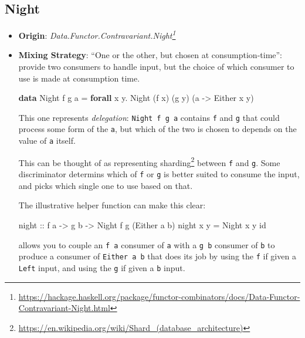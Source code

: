 \documentclass[]{article}
\newenvironment{Shaded}{}{}
\newcommand{\DataTypeTok}[1]{\textcolor[rgb]{0.56,0.13,0.00}{#1}}
\newcommand{\FunctionTok}[1]{\textcolor[rgb]{0.02,0.16,0.49}{#1}}
\newcommand{\KeywordTok}[1]{\textcolor[rgb]{0.00,0.44,0.13}{\textbf{#1}}}
\newcommand{\NormalTok}[1]{#1}
\newcommand{\OperatorTok}[1]{\textcolor[rgb]{0.40,0.40,0.40}{#1}}
\newcommand{\OtherTok}[1]{\textcolor[rgb]{0.00,0.44,0.13}{#1}}
\renewcommand{\href}[2]{#2\footnote{\url{#1}}}
\begin{document}
\subsection{Night}\label{night}

\begin{itemize}
\item
  \textbf{Origin}:
  \emph{\href{https://hackage.haskell.org/package/functor-combinators/docs/Data-Functor-Contravariant-Night.html}{Data.Functor.Contravariant.Night}}
\item
  \textbf{Mixing Strategy}: ``One or the other, but chosen at
  consumption-time'': provide two consumers to handle input, but the choice of
  which consumer to use is made at consumption time.

\begin{Shaded}
\begin{Highlighting}[]
\KeywordTok{data} \DataTypeTok{Night}\NormalTok{ f g a }\OtherTok{=} \KeywordTok{forall}\NormalTok{ x y}\OperatorTok{.} \DataTypeTok{Night}\NormalTok{ (f x) (g y) (a }\OtherTok{{-}\textgreater{}} \DataTypeTok{Either}\NormalTok{ x y)}
\end{Highlighting}
\end{Shaded}

  This one represents \emph{delegation}: \texttt{Night\ f\ g\ a} contains
  \texttt{f} and \texttt{g} that could process some form of the \texttt{a}, but
  which of the two is chosen to depends on the value of \texttt{a} itself.

  This can be thought of as representing
  \href{https://en.wikipedia.org/wiki/Shard_(database_architecture)}{sharding}
  between \texttt{f} and \texttt{g}. Some discriminator determins which of
  \texttt{f} or \texttt{g} is better suited to consume the input, and picks
  which single one to use based on that.

  The illustrative helper function can make this clear:

\begin{Shaded}
\begin{Highlighting}[]
\OtherTok{night ::}\NormalTok{ f a }\OtherTok{{-}\textgreater{}}\NormalTok{ g b }\OtherTok{{-}\textgreater{}} \DataTypeTok{Night}\NormalTok{ f g (}\DataTypeTok{Either}\NormalTok{ a b)}
\NormalTok{night x y }\OtherTok{=} \DataTypeTok{Night}\NormalTok{ x y }\FunctionTok{id}
\end{Highlighting}
\end{Shaded}

  allows you to couple an \texttt{f\ a} consumer of \texttt{a} with a
  \texttt{g\ b} consumer of \texttt{b} to produce a consumer of
  \texttt{Either\ a\ b} that does its job by using the \texttt{f} if given a
  \texttt{Left} input, and using the \texttt{g} if given a \texttt{b} input.


\end{itemize}
\end{document}
